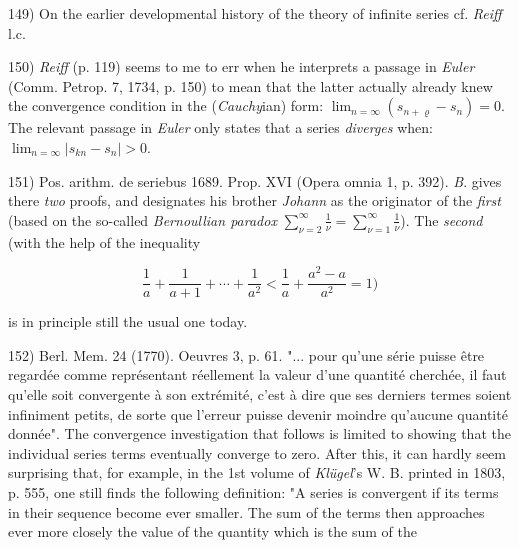 \vfill
\leftline{\rule{2in}{0.4pt}}
\vspace{0.2cm}
{
\footnotesize
149) On the earlier developmental history of the theory of infinite series cf. \textit{Reiff} l.c.

150) \textit{Reiff} (p. 119) seems to me to err when he interprets a passage in \textit{Euler} (Comm. Petrop. 7, 1734, p. 150) to mean that the latter actually already knew the convergence condition in the (\textit{Cauchy}ian) form: $\lim_{n=\infty} (s_{n+\varrho} - s_n) = 0$. The relevant passage in \textit{Euler} only states that a series \textit{diverges} when: $\lim_{n=\infty} |s_{kn} - s_n| > 0$.

151) Pos. arithm. de seriebus 1689. Prop. XVI (Opera omnia 1, p. 392). \textit{B}. gives there \textit{two} proofs, and designates his brother \textit{Johann} as the originator of the \textit{first} (based on the so-called \textit{Bernoullian paradox} $\sum_{\nu=2}^{\infty} \frac{1}{\nu} = \sum_{\nu=1}^{\infty} \frac{1}{\nu}$). The \textit{second} (with the help of the inequality 

$$\frac{1}{a} + \frac{1}{a+1} + \cdots + \frac{1}{a^2} < \frac{1}{a} + \frac{a^2 - a}{a^2} = 1)$$ 

is in principle still the usual one today.

152) Berl. Mem. 24 (1770). Oeuvres 3, p. 61. "... pour qu'une série puisse être regardée comme représentant réellement la valeur d'une quantité cherchée, il faut qu'elle soit convergente à son extrémité, c'est à dire que ses derniers termes soient infiniment petits, de sorte que l'erreur puisse devenir moindre qu'aucune quantité donnée". The convergence investigation that follows is limited to showing that the individual series terms eventually converge to zero. After this, it can hardly seem surprising that, for example, in the 1st volume of \textit{Klügel}'s W. B. printed in 1803, p. 555, one still finds the following definition: "A series is convergent if its terms in their sequence become ever smaller. The sum of the terms then approaches ever more closely the value of the quantity which is the sum of the

}